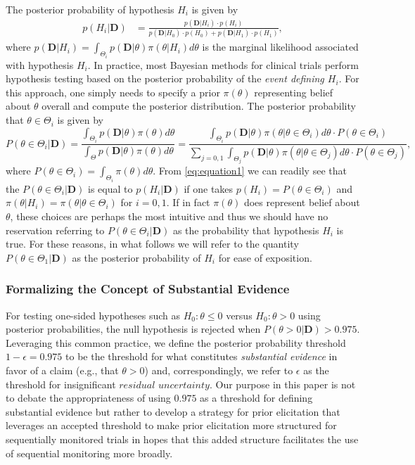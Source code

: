 \documentclass[12pt]{article}
\begin{document}
The posterior probability of hypothesis $H_i$ is given by 
\begin{eqnarray*}
p(H_i|\mathbf{D})&=\frac{p(\mathbf{D}|H_i)\cdot p(H_i)}{p(\mathbf{D}|H_0)\cdot p(H_0)+p(\mathbf{D}|H_1)\cdot p(H_1)},
\end{eqnarray*}
where $p(\mathbf{D}|H_i) = \int_{\Theta_i} p(\mathbf{D}|\theta)\pi(\theta|H_i)d\theta$ is the marginal likelihood associated with hypothesis $H_i$.
%
In practice, most Bayesian methods for clinical trials perform hypothesis testing based on the posterior probability of the \textit{event defining $H_i$}.
%
For this approach, one simply needs to specify a prior $\pi\left(\theta\right)$ representing belief about $\theta$ overall and compute the posterior distribution.
%
The posterior probability that $\theta\in\Theta_i$ is given by
\begin{equation}
P(\theta\in\Theta_i|\mathbf{D})
=\frac{\int_{\Theta_i} p(\mathbf{D}|\theta)\pi (\theta)d\theta}{\int_{\Theta}p(\mathbf{D}|\theta)\pi(\theta) d\theta}
=\frac{\int_{\Theta_i} p(\mathbf{D}|\theta)\pi (\theta|\theta\in\Theta_i)d\theta\cdot P(\theta\in\Theta_i)}
      { \sum_{j=0,1} \int_{\Theta_j}p(\mathbf{D}|\theta)\pi (\theta|\theta\in\Theta_j)d\theta\cdot P(\theta\in\Theta_j) } \label{eq:equation1},
\end{equation}
where $P(\theta\in\Theta_i)=\int_{\Theta_i}\pi(\theta)d\theta$. 
%
From \eqref{eq:equation1} we can readily see that the $P(\theta\in\Theta_i|\mathbf{D})$ is equal to $p(H_i|\mathbf{D})$ if one takes
$p(H_i) =P(\theta\in\Theta_i)$ and $\pi\left(\theta \big| H_i\right) = \pi\left(\theta\big|\theta \in \Theta_i\right)$ for $i=0,1$.
%
If in fact $\pi\left(\theta\right)$ does represent belief about $\theta$, these choices are perhaps the most intuitive and thus 
we should have no reservation referring to $P(\theta\in\Theta_i|\mathbf{D})$ as the probability that hypothesis $H_i$ is true.
%
For these reasons, in what follows we will refer to the quantity $P(\theta\in\Theta_1|\mathbf{D})$ 
as the posterior probability of $H_i$ for ease of exposition.

\subsubsection{Formalizing the Concept of Substantial Evidence}
For testing one-sided hypotheses such as $H_0: \theta \le 0$ versus $H_0: \theta > 0$ using posterior probabilities, the null hypothesis 
is rejected when $P(\theta > 0 |\mathbf{D})>0.975$.
%
Leveraging this common practice, we define the posterior probability threshold $1-\epsilon=0.975$ to be the threshold for what constitutes 
\textit{substantial evidence} in favor of a claim (e.g., that $\theta > 0$) and, correspondingly, we refer to $\epsilon$ as the threshold 
for insignificant $\textit{residual uncertainty}$.
%
Our purpose in this paper is not to debate the appropriateness of using $0.975$ as a threshold for defining substantial evidence but rather to 
develop a strategy for prior elicitation that leverages an accepted threshold to make prior elicitation more structured for sequentially monitored 
trials in hopes that this added structure facilitates the use of sequential monitoring more broadly.
\end{document}
